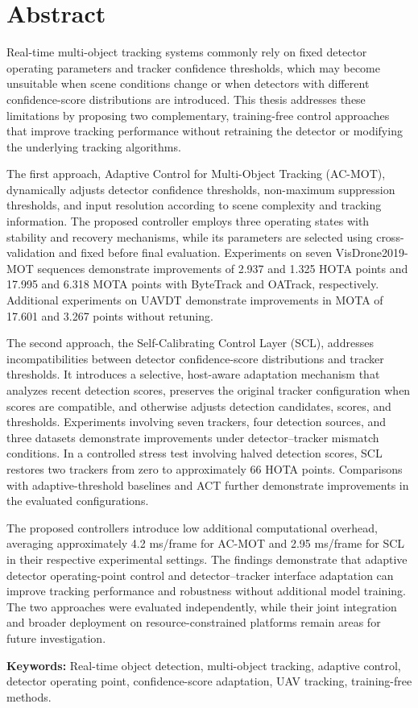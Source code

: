 \chapter*{Abstract}

Real-time multi-object tracking systems commonly rely on fixed detector operating parameters and tracker confidence thresholds, which may become unsuitable when scene conditions change or when detectors with different confidence-score distributions are introduced. This thesis addresses these limitations by proposing two complementary, training-free control approaches that improve tracking performance without retraining the detector or modifying the underlying tracking algorithms.

The first approach, Adaptive Control for Multi-Object Tracking (AC-MOT), dynamically adjusts detector confidence thresholds, non-maximum suppression thresholds, and input resolution according to scene complexity and tracking information. The proposed controller employs three operating states with stability and recovery mechanisms, while its parameters are selected using cross-validation and fixed before final evaluation. Experiments on seven VisDrone2019-MOT sequences demonstrate improvements of 2.937 and 1.325 HOTA points and 17.995 and 6.318 MOTA points with ByteTrack and OATrack, respectively. Additional experiments on UAVDT demonstrate improvements in MOTA of 17.601 and 3.267 points without retuning.

The second approach, the Self-Calibrating Control Layer (SCL), addresses incompatibilities between detector confidence-score distributions and tracker thresholds. It introduces a selective, host-aware adaptation mechanism that analyzes recent detection scores, preserves the original tracker configuration when scores are compatible, and otherwise adjusts detection candidates, scores, and thresholds. Experiments involving seven trackers, four detection sources, and three datasets demonstrate improvements under detector--tracker mismatch conditions. In a controlled stress test involving halved detection scores, SCL restores two trackers from zero to approximately 66 HOTA points. Comparisons with adaptive-threshold baselines and ACT further demonstrate improvements in the evaluated configurations.

The proposed controllers introduce low additional computational overhead, averaging approximately 4.2 ms/frame for AC-MOT and 2.95 ms/frame for SCL in their respective experimental settings. The findings demonstrate that adaptive detector operating-point control and detector--tracker interface adaptation can improve tracking performance and robustness without additional model training. The two approaches were evaluated independently, while their joint integration and broader deployment on resource-constrained platforms remain areas for future investigation.

\vspace{0.5cm}
\noindent\textbf{Keywords:} Real-time object detection, multi-object tracking, adaptive control, detector operating point, confidence-score adaptation, UAV tracking, training-free methods.

